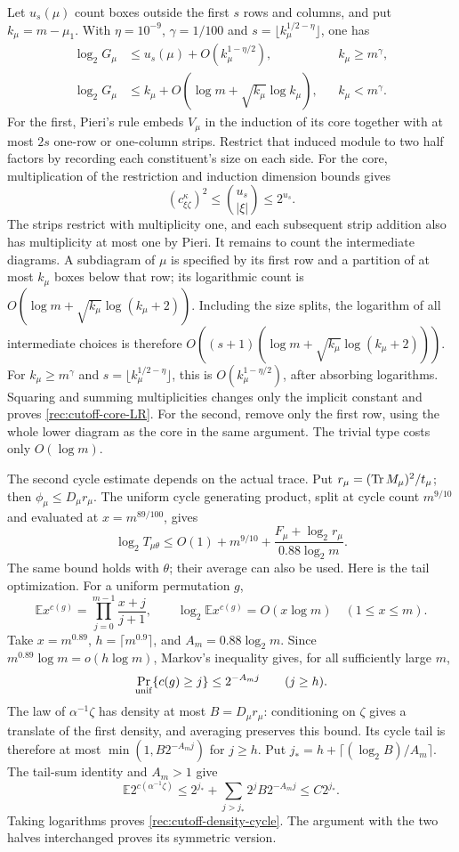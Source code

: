 Let $u_s(\mu)$ count boxes outside the first $s$ rows and columns,
and put $k_\mu=m-\mu_1$.
With $\eta=10^{-9}$, $\gamma=1/100$ and
$s=\lfloor k_\mu^{1/2-\eta}\rfloor$, one has
\begin{align}
 \log_2G_\mu&\le u_s(\mu)+O(k_\mu^{1-\eta/2}),
                  &&k_\mu\ge m^\gamma,\label{rec:cutoff-core-LR}\\
 \log_2G_\mu&\le k_\mu+O(\log m+\sqrt{k_\mu}\log k_\mu),
                  &&k_\mu<m^\gamma.
                  \label{rec:cutoff-sparse-LR}
\end{align}
For the first, Pieri's rule embeds $V_\mu$ in the induction of its
core together with at most $2s$ one-row or one-column strips.  Restrict
that induced module to two half factors by recording each constituent's
size on each side.  For the core, multiplication of the restriction and
induction dimension bounds gives
\[
 (c_{\xi\zeta}^{\kappa})^2\le\binom{u_s}{|\xi|}\le2^{u_s}.
\]
The strips restrict with multiplicity one, and each subsequent strip
addition also has multiplicity at most one by Pieri.  It remains to count
the intermediate diagrams.  A subdiagram of $\mu$ is specified by its
first row and a partition of at most $k_\mu$ boxes below that row;
its logarithmic count is
$O(\log m+\sqrt{k_\mu}\log(k_\mu+2))$.
Including the size splits, the logarithm of all intermediate choices is
therefore
$O((s+1)(\log m+\sqrt{k_\mu}\log(k_\mu+2)))$.
For $k_\mu\ge m^\gamma$ and
$s=\lfloor k_\mu^{1/2-\eta}\rfloor$, this is
$O(k_\mu^{1-\eta/2})$, after absorbing logarithms.  Squaring and
summing multiplicities changes only the implicit constant and proves
\eqref{rec:cutoff-core-LR}.  For the second, remove only the first row,
using the whole lower diagram as the core in the same argument.
The trivial type costs only $O(\log m)$.

The second cycle estimate depends on the actual trace.  Put
$r_\mu=(\operatorname{Tr} M_\mu)^2/t_\mu$; then
$\phi_\mu\le D_\mu r_\mu$.  The uniform cycle generating product,
split at cycle count $m^{9/10}$ and evaluated at $x=m^{89/100}$,
gives
\begin{equation}\label{rec:cutoff-density-cycle}
 \log_2T_{\mu\theta}\le
 O(1)+m^{9/10}+
 \frac{F_\mu+\log_2r_\mu}{0.88\log_2m}.
\end{equation}
The same bound holds with $\theta$; their average can also be used.
Here is the tail optimization.  For a uniform permutation $g$,
\[
 \mathbb E x^{c(g)}=\prod_{j=0}^{m-1}\frac{x+j}{j+1},\qquad
 \log_2\mathbb E x^{c(g)}=O(x\log m)
 \quad(1\le x\le m).
\]
Take $x=m^{0.89}$, $h=\lceil m^{0.9}\rceil$, and
$A_m=0.88\log_2m$.  Since $m^{0.89}\log m=o(h\log m)$, Markov's
inequality gives, for all sufficiently large $m$,
\[
 \Pr_{\rm unif}\{c(g)\ge j\}\le2^{-A_m j}\qquad(j\ge h).
\]
The law of $\alpha^{-1}\zeta$ has density at most
$B=D_\mu r_\mu$: conditioning on $\zeta$ gives a translate of
the first density, and averaging preserves this bound.  Its cycle tail
is therefore at most $\min(1,B2^{-A_mj})$ for $j\ge h$.
Put $j_*=h+\lceil(\log_2B)/A_m\rceil$.  The tail-sum identity and
$A_m>1$ give
\[
 \mathbb E2^{c(\alpha^{-1}\zeta)}
 \le2^{j_*}+\sum_{j>j_*}2^j B2^{-A_mj}
 \le C2^{j_*}.
\]
Taking logarithms proves \eqref{rec:cutoff-density-cycle}.  The argument
with the two halves interchanged proves its symmetric version.

